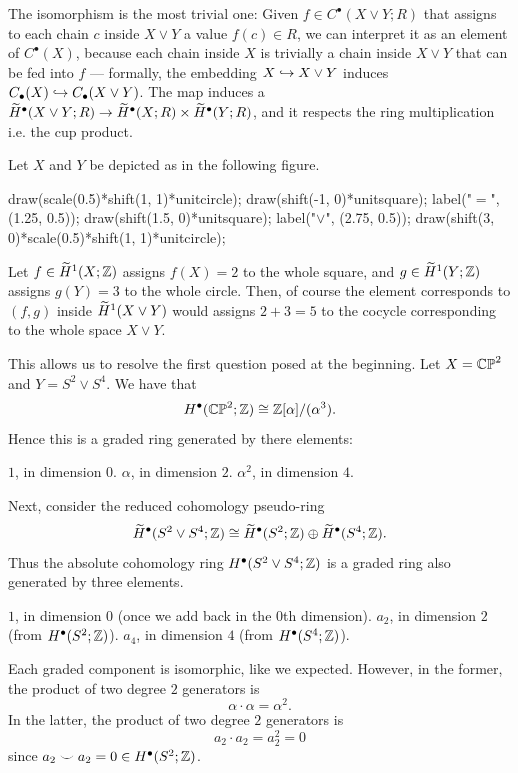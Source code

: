 The isomorphism is the most trivial one:
Given $f \in C^\bullet(X \vee Y; R)$ that assigns to each chain $c$ inside $X \vee Y$ a value
$f(c) \in R$, we can interpret it as an element of $C^\bullet(X)$, because each chain inside $X$ is
trivially a chain inside $X \vee Y$ that can be fed into $f$ ---
formally, the embedding $X \hookrightarrow X \vee Y$ induces
$C_\bullet(X) \hookrightarrow C_\bullet(X \vee Y)$. The map induces a $\widetilde H^\bullet(X \vee Y; R)
\to \widetilde H^\bullet(X; R) \times \widetilde H^\bullet(Y; R)$, and it respects the ring multiplication i.e.
the cup product.

\begin{example}
	Let $X$ and $Y$ be depicted as in the following figure.
	\begin{center}
	\begin{asy}
		draw(scale(0.5)*shift(1, 1)*unitcircle);
		draw(shift(-1, 0)*unitsquare);
		label("$=$", (1.25, 0.5));
		draw(shift(1.5, 0)*unitsquare);
		label("$\vee$", (2.75, 0.5));
		draw(shift(3, 0)*scale(0.5)*shift(1, 1)*unitcircle);
	\end{asy}
	\end{center}
	Let $f \in \widetilde H^1(X; \mathbb Z)$ assigns $f(X) = 2$ to the whole square, and
	$g \in \widetilde H^1(Y; \mathbb Z)$ assigns $g(Y) = 3$ to the whole circle.
	Then, of course the element corresponds to $(f, g)$ inside $\widetilde H^1(X \vee Y)$ would assigns
	$2 + 3 = 5$ to the cocycle corresponding to the whole space $X \vee Y$.
\end{example}

This allows us to resolve the first question posed at the beginning.
Let $X = \mathbb{CP}^2$ and $Y = S^2 \vee S^4$.
We have that
\[ H^\bullet(\mathbb{CP}^2; \mathbb Z) \cong \mathbb Z[\alpha] / (\alpha^3). \]
Hence this is a graded ring generated by there elements:
\begin{itemize}
	\ii $1$, in dimension $0$.
	\ii $\alpha$, in dimension $2$.
	\ii $\alpha^2$, in dimension $4$.
\end{itemize}
Next, consider the reduced cohomology pseudo-ring
\[ \widetilde H^\bullet(S^2 \vee S^4; \mathbb Z) \cong
	\widetilde H^\bullet(S^2; \mathbb Z)
	\oplus \widetilde H^\bullet(S^4 ; \mathbb Z).
\]
Thus the absolute cohomology ring $H^\bullet(S^2 \vee S^4 ; \mathbb Z)$
is a graded ring also generated by three elements.
\begin{itemize}
	\ii $1$, in dimension $0$ (once we add back in the $0$th dimension).
	\ii $a_2$, in dimension $2$ (from $H^\bullet(S^2 ; \mathbb Z)$).
	\ii $a_4$, in dimension $4$ (from $H^\bullet(S^4 ; \mathbb Z)$).
\end{itemize}
Each graded component is isomorphic, like we expected.
However, in the former, the product of two degree $2$ generators is
\[ \alpha \cdot \alpha = \alpha^2. \]
In the latter, the product of two degree $2$ generators is
\[ a_2 \cdot a_2 = a_2^2 = 0 \]
since $a_2 \smile a_2 = 0 \in H^\bullet(S^2; \mathbb Z)$.

